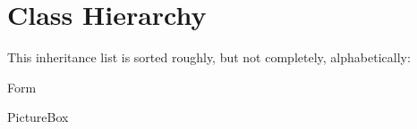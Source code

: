 \section{Class Hierarchy}
This inheritance list is sorted roughly, but not completely, alphabetically\+:\begin{DoxyCompactList}
\item Form\begin{DoxyCompactList}
\item {}
\end{DoxyCompactList}
\item Picture\+Box\begin{DoxyCompactList}
\item {}
\end{DoxyCompactList}
\item {}
\end{DoxyCompactList}
